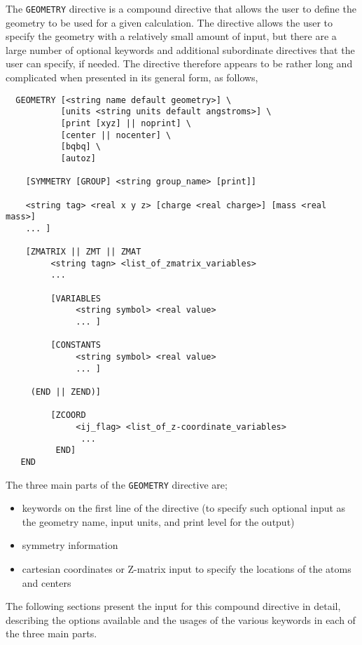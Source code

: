 \label{sec:geom}

The \verb+GEOMETRY+ directive is a compound directive that allows the
user to define the geometry to be used for a given calculation.  The
directive allows the user to specify the geometry with a relatively
small amount of input, but there are a large number of optional
keywords and additional subordinate directives that the user can
specify, if needed.  The directive therefore appears to be rather long
and complicated when presented in its general form, as follows,
\begin{verbatim}
  GEOMETRY [<string name default geometry>] \
           [units <string units default angstroms>] \
           [print [xyz] || noprint] \
           [center || nocenter] \
           [bqbq] \
           [autoz]
    
    [SYMMETRY [GROUP] <string group_name> [print]]

    <string tag> <real x y z> [charge <real charge>] [mass <real mass>]
    ... ]

    [ZMATRIX || ZMT || ZMAT
         <string tagn> <list_of_zmatrix_variables>
         ... 

         [VARIABLES
              <string symbol> <real value>
              ... ]
 
         [CONSTANTS
              <string symbol> <real value>
              ... ]

     (END || ZEND)]

         [ZCOORD
              <ij_flag> <list_of_z-coordinate_variables>
               ...
          END]
   END
\end{verbatim}

The three main parts of the \verb+GEOMETRY+ directive
are;

\begin{itemize}
\item keywords on the first line of the directive (to specify such optional
input as the geometry name, input units, and print level for the output)
\item symmetry information
\item cartesian coordinates or Z-matrix input to specify the locations 
of the atoms and centers
\end{itemize}

The following sections present the input for this compound directive in
detail, describing the options available and the usages of the various
keywords in each of the three main parts.


